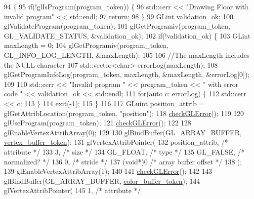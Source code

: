 \begin{DoxyCode}
94                                           \{
95   \textcolor{keywordflow}{if}(!glIsProgram(program\_token)) \{
96     std::cerr << \textcolor{stringliteral}{"Drawing Floor with invalid program"} << std::endl;
97     \textcolor{keywordflow}{return};
98   \}
99   GLint validation\_ok;
100   glValidateProgram(program\_token);
101   glGetProgramiv(program\_token, GL\_VALIDATE\_STATUS, &validation\_ok);
102   \textcolor{keywordflow}{if}(!validation\_ok) \{
103     GLint maxLength = 0;
104     glGetProgramiv(program\_token, GL\_INFO\_LOG\_LENGTH, &maxLength);
105 
106     \textcolor{comment}{//The maxLength includes the NULL character}
107     std::vector<char> errorLog(maxLength);
108     glGetProgramInfoLog(program\_token, maxLength, &maxLength, &errorLog[0]);
109 
110     std::cerr << \textcolor{stringliteral}{"Invalid program "} << program\_token << \textcolor{stringliteral}{" with error code "} << validation\_ok << std::endl;
111     \textcolor{keywordflow}{for}(\textcolor{keyword}{auto} c: errorLog) \{
112       std::cerr << c;
113     \}
114     exit(-1);
115   \}
116 
117   GLuint position\_attrib = glGetAttribLocation(program\_token, \textcolor{stringliteral}{"position"});
118   \hyperlink{FloorAsset_8cc_a75f201b0e53e68726854997957322b8d}{checkGLError}();
119 
120   glUseProgram(program\_token);
121   \hyperlink{FloorAsset_8cc_a75f201b0e53e68726854997957322b8d}{checkGLError}();
122 
128   glEnableVertexAttribArray(0);
129 
130   glBindBuffer(GL\_ARRAY\_BUFFER, \hyperlink{classFloorAsset_a5fdd868b2e2a52dabfe2387c903e3862}{vertex\_buffer\_token});
131   glVertexAttribPointer(
132                         position\_attrib,               \textcolor{comment}{/* attribute */}
133                         3,                             \textcolor{comment}{/* size */}
134                         GL\_FLOAT,                      \textcolor{comment}{/* type */}
135                         GL\_FALSE,                      \textcolor{comment}{/* normalized? */}
136                         0,                             \textcolor{comment}{/* stride */}
137                         (\textcolor{keywordtype}{void}*)0                       \textcolor{comment}{/* array buffer offset */}
138                         );
139   glEnableVertexAttribArray(1);
140 
141   \hyperlink{FloorAsset_8cc_a75f201b0e53e68726854997957322b8d}{checkGLError}();
142 
143   glBindBuffer(GL\_ARRAY\_BUFFER, \hyperlink{classFloorAsset_a54863f3a9f4c2f484342359ac49ca419}{color\_buffer\_token});
144   glVertexAttribPointer(
145                         1,                             \textcolor{comment}{/* attribute */}

\end{DoxyCode}
